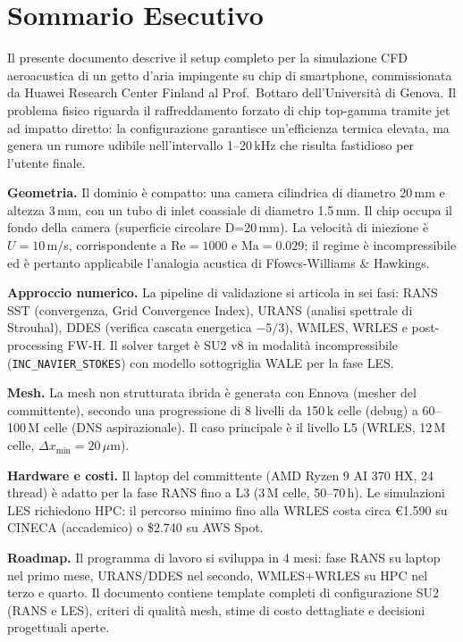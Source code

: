 \documentclass[11pt,a4paper]{article}
\newcommand{\ttcfg}[1]{\texttt{\color{codegray}#1}}
\newcommand{\Rey}{\mathrm{Re}}
\newcommand{\Ma}{\mathrm{Ma}}
\newcommand{\mum}{\,\mu\mathrm{m}}
\begin{document}
\newpage
\section*{Sommario Esecutivo}

Il presente documento descrive il setup completo per la simulazione CFD aeroacustica di un getto d'aria impingente su chip di smartphone, commissionata da Huawei Research Center Finland al Prof.\ Bottaro dell'Università di Genova. Il problema fisico riguarda il raffreddamento forzato di chip top-gamma tramite jet ad impatto diretto: la configurazione garantisce un'efficienza termica elevata, ma genera un rumore udibile nell'intervallo 1--20\,kHz che risulta fastidioso per l'utente finale.

\textbf{Geometria.} Il dominio è compatto: una camera cilindrica di diametro 20\,mm e altezza 3\,mm, con un tubo di inlet coassiale di diametro 1.5\,mm. Il chip occupa il fondo della camera (superficie circolare D=20\,mm). La velocità di iniezione è $U=10$\,m/s, corrispondente a $\Rey = 1000$ e $\Ma = 0.029$; il regime è incompressibile ed è pertanto applicabile l'analogia acustica di Ffowcs-Williams \& Hawkings.

\textbf{Approccio numerico.} La pipeline di validazione si articola in sei fasi: RANS SST (convergenza, Grid Convergence Index), URANS (analisi spettrale di Strouhal), DDES (verifica cascata energetica $-5/3$), WMLES, WRLES e post-processing FW-H. Il solver target è SU2 v8 in modalità incompressibile (\ttcfg{INC\_NAVIER\_STOKES}) con modello sottogriglia WALE per la fase LES.

\textbf{Mesh.} La mesh non strutturata ibrida è generata con Ennova (mesher del committente), secondo una progressione di 8 livelli da 150\,k celle (debug) a 60--100\,M celle (DNS aspirazionale). Il caso principale è il livello L5 (WRLES, 12\,M celle, $\Delta x_{\min}=20\mum$).

\textbf{Hardware e costi.} Il laptop del committente (AMD Ryzen 9 AI 370 HX, 24 thread) è adatto per la fase RANS fino a L3 (3\,M celle, 50--70\,h). Le simulazioni LES richiedono HPC: il percorso minimo fino alla WRLES costa circa €1.590 su CINECA (accademico) o \$2.740 su AWS Spot.

\textbf{Roadmap.} Il programma di lavoro si sviluppa in 4 mesi: fase RANS su laptop nel primo mese, URANS/DDES nel secondo, WMLES+WRLES su HPC nel terzo e quarto. Il documento contiene template completi di configurazione SU2 (RANS e LES), criteri di qualità mesh, stime di costo dettagliate e decisioni progettuali aperte.
\end{document}
